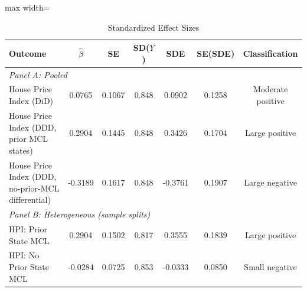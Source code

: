 \begin{table}[htbp]
\centering
\caption{Standardized Effect Sizes}
\label{tab:sde}
\begin{adjustbox}{max width=\textwidth}
\begin{tabular}{lcccccc}
\hline\hline
Outcome & $\hat{\beta}$ & SE & SD($Y$) & SDE & SE(SDE) & Classification \\
\hline
\multicolumn{7}{l}{\textit{Panel A: Pooled}} \\
House Price Index (DiD) & 0.0765 & 0.1067 & 0.848 & 0.0902 & 0.1258 & Moderate positive \\
House Price Index (DDD, prior MCL states) & 0.2904 & 0.1445 & 0.848 & 0.3426 & 0.1704 & Large positive \\
House Price Index (DDD, no-prior-MCL differential) & -0.3189 & 0.1617 & 0.848 & -0.3761 & 0.1907 & Large negative \\
\hline
\multicolumn{7}{l}{\textit{Panel B: Heterogeneous (sample splits)}} \\
HPI: Prior State MCL & 0.2904 & 0.1502 & 0.817 & 0.3555 & 0.1839 & Large positive \\
HPI: No Prior State MCL & -0.0284 & 0.0725 & 0.853 & -0.0333 & 0.0850 & Small negative \\
\hline\hline
\end{tabular}
\end{adjustbox}

\end{table}

